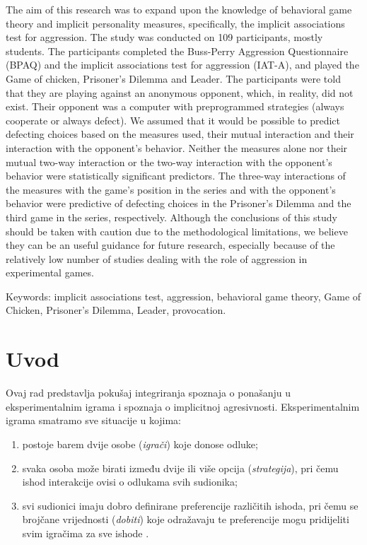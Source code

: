 \documentclass[a4paper, 12pt]{report}
\begin{document}
\begin{singlespace}
\noindent The aim of this research was to expand upon the knowledge of behavioral game theory
and implicit personality measures, specifically, the implicit associations test
for aggression. The study was conducted on 109 participants, mostly students.
The participants completed the Buss-Perry Aggression Questionnaire (BPAQ) and
the implicit associations test for aggression (IAT-A), and played the Game of
chicken, Prisoner's Dilemma and Leader. The participants were told that they are
playing against an anonymous opponent, which, in reality, did not exist. Their
opponent was a computer with preprogrammed strategies (always cooperate or
always defect). We assumed that it would be possible to predict defecting
choices based on the measures used, their mutual interaction and their
interaction with the opponent's behavior. Neither the measures alone nor their
mutual two-way interaction or the two-way interaction with the opponent's
behavior were statistically significant predictors. The three-way interactions
of the measures with the game's position in the series and with the opponent's
behavior were predictive of defecting choices in the Prisoner's Dilemma and the
third game in the series, respectively. Although the conclusions of this study
should be taken with caution due to the methodological limitations, we believe
they can be an useful guidance for future research, especially because of the
relatively low number of studies dealing with the role of aggression in
experimental games.
\bigskip

\noindent Keywords: implicit associations test, aggression, behavioral game
theory, Game of Chicken, Prisoner's Dilemma, Leader, provocation.
\end{singlespace}

\thispagestyle{empty}
\clearpage

\setcounter{page}{1}
\section{Uvod}

Ovaj rad predstavlja pokušaj integriranja spoznaja o ponašanju u
eksperimentalnim igrama i spoznaja o implicitnoj agresivnosti.
Eksperimentalnim igrama smatramo sve situacije u kojima: 
\begin{enumerate}[label = (\alph*)]
    \item postoje barem dvije osobe (\emph{igrači}) koje donose odluke;
    \item svaka osoba može birati između dvije ili više opcija
        (\emph{strategija}), pri čemu ishod
        interakcije ovisi o odlukama svih sudionika;
    \item svi sudionici imaju dobro definirane preferencije  različitih
        ishoda, pri čemu se brojčane vrijednosti (\emph{dobiti}) koje odražavaju te
        preferencije mogu pridijeliti svim igračima za sve ishode \citep{colgt}.
\end{enumerate}
\end{document}
